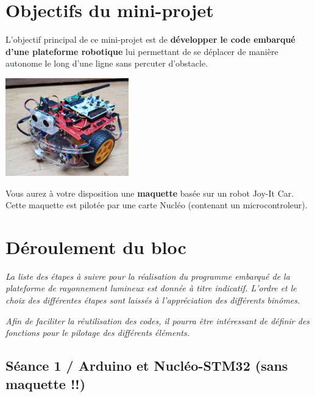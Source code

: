 \documentclass[a4paper,11pt,titlepage]{article} %
\begin{document}
\section{Objectifs du mini-projet}

L'objectif principal de ce mini-projet est de \textbf{développer le code embarqué d'une plateforme robotique} lui permettant de se déplacer de manière autonome le long d'une ligne sans percuter d'obstacle.

\begin{center}
	\includegraphics[width=0.4\textwidth]{images/robot_joycar.jpg}
\end{center}


\medskip

Vous aurez à votre disposition une \textbf{maquette} basée sur un robot Joy-It Car. Cette maquette est pilotée par une carte Nucléo (contenant un microcontroleur).


\newpage

\section{Déroulement du bloc}

\textit{La liste des étapes à suivre pour la réalisation du programme embarqué de la plateforme de rayonnement lumineux est donnée à titre indicatif. L'ordre et le choix des différentes étapes sont laissés à l'appréciation des différents binômes.}

\textit{Afin de faciliter la réutilisation des codes, il pourra être intéressant de définir des fonctions pour le pilotage des différents éléments.}

\subsection{Séance 1 / Arduino et Nucléo-STM32 (sans maquette !!)}
\end{document}
